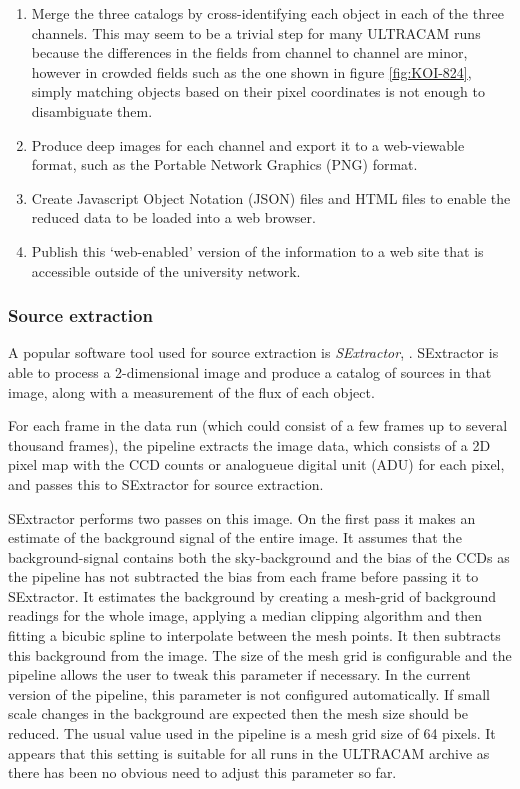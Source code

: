 \begin{enumerate}
	\item Merge the three catalogs by cross-identifying each object in each of the three channels. This may seem to be a trivial step for many ULTRACAM runs because the differences in the fields from channel to channel are minor, however in crowded fields such as the one shown in figure \ref{fig:KOI-824}, simply matching objects based on their pixel coordinates is not enough to disambiguate them.
	\item Produce deep images for each channel and export it to a web-viewable format, such as the Portable Network Graphics (PNG) format. 
	\item Create Javascript Object Notation (JSON) files and HTML files to enable the reduced data to be loaded into a web browser.
	\item Publish this `web-enabled' version of the information to a web site that is accessible outside of the university network.  
\end{enumerate}

\subsubsection{Source extraction}
A popular software tool used for source extraction is \emph{SExtractor}, \citep{bertin}. SExtractor is able to process a 2-dimensional image and produce a catalog of sources in that image, along with a measurement of the flux of each object. 

For each frame in the data run (which could consist of a few frames up to several thousand frames), the pipeline extracts the image data, which consists of a 2D pixel map with the CCD counts or analogueue digital unit (ADU) for each pixel, and passes this to SExtractor for source extraction. 

SExtractor performs two passes on this image. On the first pass it makes an estimate of the background signal of the entire image. It assumes that the background-signal contains both the sky-background and the bias of the CCDs as the pipeline has not subtracted the bias from each frame before passing it to SExtractor. It estimates the background by creating a mesh-grid of background readings for the whole image, applying a median clipping algorithm and then fitting a bicubic spline to interpolate between the mesh points. It then subtracts this background from the image. The size of the mesh grid is configurable and the pipeline allows the user to tweak this parameter if necessary. In the current version of the pipeline, this parameter is not configured automatically.  If small scale changes in the background are expected then the mesh size should be reduced. The usual value used in the pipeline is a mesh grid size of 64 pixels. It appears that this setting is suitable for all runs in the ULTRACAM archive as there has been no obvious need to adjust this parameter so far. 

